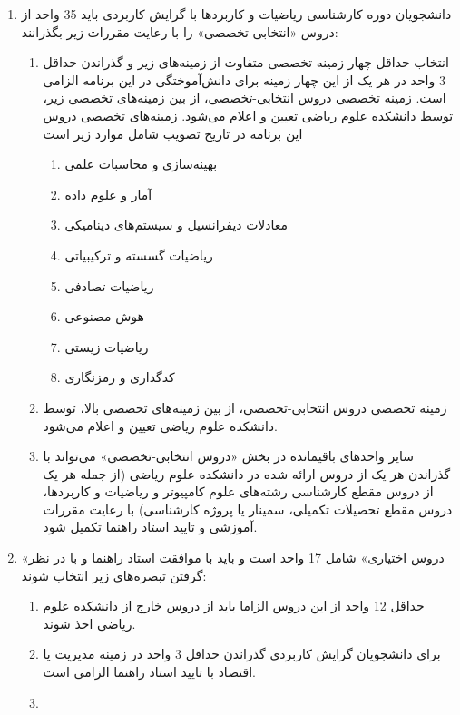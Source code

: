 \documentclass{article}
\begin{document}
\begin{enumerate}
\begin{enumerate}
        \end{enumerate}
        \item
        دانشجویان دوره کارشناسی ریاضیات و کاربردها با گرایش کاربردی باید 35 واحد از دروس «انتخابی-تخصصی» را با رعایت مقررات زیر بگذرانند:
        \begin{enumerate}
        	\item
        انتخاب حداقل چهار زمینه تخصصی متفاوت از زمینه‌های زیر و گذراندن حداقل 3 واحد در هر یک از این چهار زمینه‌ برای دانش‌آموختگی در این برنامه الزامی است. زمینه‌ تخصصی دروس انتخابی-تخصصی، از بین زمینه‌های تخصصی زیر، توسط دانشکده علوم ریاضی تعیین و اعلام می‌شود. زمینه‌های تخصصی دروس این برنامه در تاریخ تصویب شامل موارد زیر است
        \begin{enumerate}
			\item
				بهینه‌سازی و محاسبات علمی
        	\item
				آمار و علوم داده
        	\item
				معادلات دیفرانسیل و سیستم‌های دینامیکی
        	\item
				ریاضیات گسسته و ترکیبیاتی
        	\item
				ریاضیات تصادفی
        	\item
				هوش مصنوعی
        	\item
				ریاضیات زیستی
        	\item
				کدگذاری و رمزنگاری
			\end{enumerate}
    \item
زمینه‌ تخصصی دروس انتخابی-تخصصی، از بین زمینه‌های تخصصی بالا، توسط دانشکده علوم ریاضی تعیین و اعلام می‌شود.
	\item
		سایر واحدهای باقیمانده در بخش «دروس انتخابی-تخصصی» می‌تواند با گذراندن هر یک از دروس ارائه شده در دانشکده علوم ریاضی (از جمله هر یک از دروس مقطع کارشناسی رشته‌های علوم کامپیوتر و ریاضیات و کاربردها، دروس مقطع تحصیلات تکمیلی، سمینار یا پروژه کار‌شناسی) با رعایت مقررات آموزشی و تایید استاد راهنما تکمیل شود.
	\end{enumerate}
        \item
         «دروس اختیاری» شامل 17 واحد است و باید با موافقت استاد راهنما و با در نظر گرفتن تبصره‌های زیر انتخاب شوند:
         \begin{enumerate}
         	\item
		 		حداقل 12 واحد از این دروس الزاما باید از دروس خارج از دانشکده علوم ریاضی اخذ شوند.
         	\item
				برای دانشجویان گرایش کاربردی گذراندن حداقل 3 واحد در زمینه مدیریت یا اقتصاد با تایید استاد راهنما الزامی است.
         	\item

\end{enumerate}
\end{enumerate}
\end{document}
